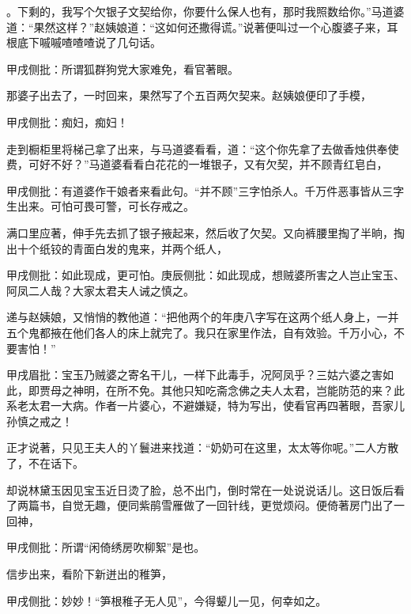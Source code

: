 \begin{parag}
。下剩的，我写个欠银子文契给你，你要什么保人也有，那时我照数给你。”马道婆道：“果然这样？”赵姨娘道：“这如何还撒得谎。”说著便叫过一个心腹婆子来，耳根底下嘁嘁喳喳喳说了几句话。\begin{note}甲戌侧批：所谓狐群狗党大家难免，看官著眼。\end{note}那婆子出去了，一时回来，果然写了个五百两欠契来。赵姨娘便印了手模，\begin{note}甲戌侧批：痴妇，痴妇！\end{note}走到橱柜里将梯己拿了出来，与马道婆看看，道：“这个你先拿了去做香烛供奉使费，可好不好？”马道婆看看白花花的一堆银子，又有欠契，并不顾青红皂白，\begin{note}甲戌侧批：有道婆作干娘者来看此句。“并不顾”三字怕杀人。千万件恶事皆从三字生出来。可怕可畏可警，可长存戒之。\end{note}满口里应著，伸手先去抓了银子掖起来，然后收了欠契。又向裤腰里掏了半晌，掏出十个纸铰的青面白发的鬼来，并两个纸人，\begin{note}甲戌侧批：如此现成，更可怕。庚辰侧批：如此现成，想贼婆所害之人岂止宝玉、阿凤二人哉？大家太君夫人诫之慎之。\end{note}递与赵姨娘，又悄悄的教他道：“把他两个的年庚八字写在这两个纸人身上，一并五个鬼都掖在他们各人的床上就完了。我只在家里作法，自有效验。千万小心，不要害怕！”\begin{note}甲戌眉批：宝玉乃贼婆之寄名干儿，一样下此毒手，况阿凤乎？三姑六婆之害如此，即贾母之神明，在所不免。其他只知吃斋念佛之夫人太君，岂能防范的来？此系老太君一大病。作者一片婆心，不避嫌疑，特为写出，使看官再四著眼，吾家儿孙慎之戒之！\end{note}正才说著，只见王夫人的丫鬟进来找道：“奶奶可在这里，太太等你呢。”二人方散了，不在话下。
\end{parag}


\begin{parag}
    却说林黛玉因见宝玉近日烫了脸，总不出门，倒时常在一处说说话儿。这日饭后看了两篇书，自觉无趣，便同紫鹃雪雁做了一回针线，更觉烦闷。便倚著房门出了一回神，\begin{note}甲戌侧批：所谓“闲倚绣房吹柳絮”是也。\end{note}信步出来，看阶下新迸出的稚笋，\begin{note}甲戌侧批：妙妙！“笋根稚子无人见”，今得颦儿一见，何幸如之。\end{note}
\end{parag}


